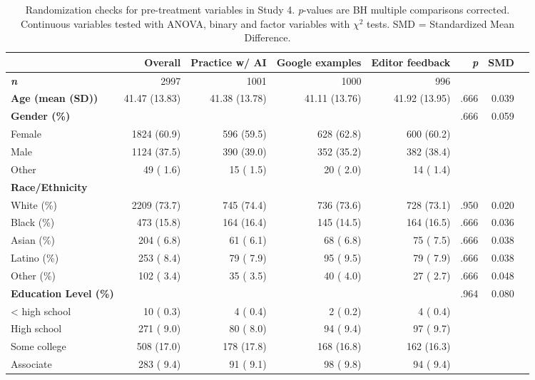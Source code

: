 \documentclass[11pt]{report}
\begin{document}
\begin{append}
\begin{table}
\footnotesize
            \caption{Randomization checks for pre-treatment variables in Study 4. \textit{p}-values are BH multiple comparisons corrected. Continuous variables tested with ANOVA, binary and factor variables with $\chi^2$ tests. SMD = Standardized Mean Difference.}

\begin{tabular}{lrrrrrrr}
\toprule
 & Overall & Practice w/ AI & Google examples & Editor feedback & \textit{p} &  SMD \\ 
\midrule
\textit{\textbf{n}} &  2997 &  1001 &  1000 &   996 &  &    \\ 
\textbf{Age (mean (SD))} & 41.47 (13.83) & 41.38 (13.78) & 41.11 (13.76) & 41.92 (13.95) & .666 &    0.039 \\ 
\textbf{Gender (\%)} &   &    &    &    & .666 &    0.059 \\ 
   Female &  1824 (60.9)  &   596 (59.5)  &   628 (62.8)  &   600 (60.2)  &  &    \\ 
   Male &  1124 (37.5)  &   390 (39.0)  &   352 (35.2)  &   382 (38.4)  &  &   \\ 
   Other &    49 ( 1.6)  &    15 ( 1.5)  &    20 ( 2.0)  &    14 ( 1.4)  &  &    \\ 
   \textbf{Race/Ethnicity} & & &&&\\
White (\%) &  2209 (73.7)  &   745 (74.4)  &   736 (73.6)  &   728 (73.1)  & .950 &    0.020 \\ 
Black (\%) &   473 (15.8)  &   164 (16.4)  &   145 (14.5)  &   164 (16.5)  & .666 &    0.036 \\ 
Asian (\%) &   204 ( 6.8)  &    61 ( 6.1)  &    68 ( 6.8)  &    75 ( 7.5)  & .666 &   0.038 \\ 
Latino (\%) &   253 ( 8.4)  &    79 ( 7.9)  &    95 ( 9.5)  &    79 ( 7.9)  & .666 &   0.038 \\ 
Other  (\%) &   102 ( 3.4)  &    35 ( 3.5)  &    40 ( 4.0)  &    27 ( 2.7)  & .666 &   0.048 \\ 
\textbf{Education Level (\%)} &   &    &    &    & .964 &    0.080 \\ 
   < high school &    10 ( 0.3)  &     4 ( 0.4)  &     2 ( 0.2)  &     4 ( 0.4)  &  &    \\ 
   High school &   271 ( 9.0)  &    80 ( 8.0)  &    94 ( 9.4)  &    97 ( 9.7)  &  &    \\ 
   Some college&   508 (17.0)  &   178 (17.8)  &   168 (16.8)  &   162 (16.3)  &  &    \\ 
   Associate  &   283 ( 9.4)  &    91 ( 9.1)  &    98 ( 9.8)  &    94 ( 9.4)  &  &    \\ 

\end{tabular}
\end{table}
\end{append}
\end{document}
